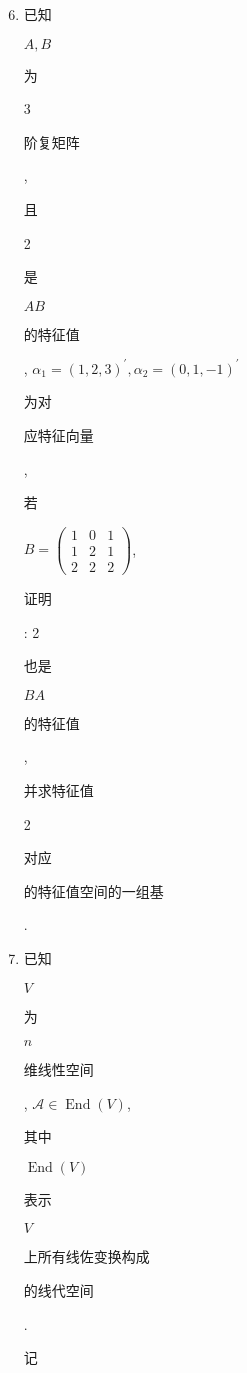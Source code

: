 \documentclass[10pt]{article}
\begin{document}
\begin{enumerate}
  \setcounter{enumi}{5}
  \item \begin{CJK}{UTF8}{mj}已知\end{CJK} $A, B$ \begin{CJK}{UTF8}{mj}为\end{CJK} 3 \begin{CJK}{UTF8}{mj}阶复矩阵\end{CJK}, \begin{CJK}{UTF8}{mj}且\end{CJK} 2 \begin{CJK}{UTF8}{mj}是\end{CJK} $A B$ \begin{CJK}{UTF8}{mj}的特征值\end{CJK}, $\alpha_{1}=(1,2,3)^{\prime}, \alpha_{2}=(0,1,-1)^{\prime}$ \begin{CJK}{UTF8}{mj}为对\end{CJK} \begin{CJK}{UTF8}{mj}应特征向量\end{CJK}, \begin{CJK}{UTF8}{mj}若\end{CJK} $B=\left(\begin{array}{lll}1 & 0 & 1 \\ 1 & 2 & 1 \\ 2 & 2 & 2\end{array}\right)$, \begin{CJK}{UTF8}{mj}证明\end{CJK}: 2 \begin{CJK}{UTF8}{mj}也是\end{CJK} $B A$ \begin{CJK}{UTF8}{mj}的特征值\end{CJK}, \begin{CJK}{UTF8}{mj}并求特征值\end{CJK} 2 \begin{CJK}{UTF8}{mj}对应\end{CJK} \begin{CJK}{UTF8}{mj}的特征值空间的一组基\end{CJK}.

  \item \begin{CJK}{UTF8}{mj}已知\end{CJK} $V$ \begin{CJK}{UTF8}{mj}为\end{CJK} $n$ \begin{CJK}{UTF8}{mj}维线性空间\end{CJK}, $\mathscr{A} \in \operatorname{End}(V)$, \begin{CJK}{UTF8}{mj}其中\end{CJK} $\operatorname{End}(V)$ \begin{CJK}{UTF8}{mj}表示\end{CJK} $V$ \begin{CJK}{UTF8}{mj}上所有线佐变换构成\end{CJK} \begin{CJK}{UTF8}{mj}的线代空间\end{CJK}. \begin{CJK}{UTF8}{mj}记\end{CJK}


\end{enumerate}
\end{document}
